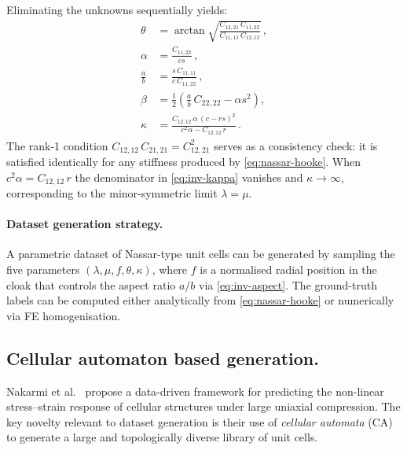 \documentclass{article}
\begin{document}
Eliminating the unknowns sequentially yields:
\begin{align}
    \theta &= \arctan\!\sqrt{\frac{C_{12,21}\,C_{11,22}}
                                   {C_{11,11}\,C_{12,12}}}\,,
    \label{eq:inv-theta}\\[4pt]
    \alpha &= \frac{C_{11,22}}{cs}\,,
    \label{eq:inv-alpha}\\[4pt]
    \frac{a}{b} &= \frac{s\,C_{11,11}}{c\,C_{11,22}}\,,
    \label{eq:inv-aspect}\\[4pt]
    \beta &= \frac{1}{2}\!\left(\frac{a}{b}\,C_{22,22}
             - \alpha s^2\right),
    \label{eq:inv-beta}\\[4pt]
    \kappa &= \frac{C_{12,12}\,\alpha\,(c-rs)^2}
                    {c^2\alpha - C_{12,12}\,r}\,.
    \label{eq:inv-kappa}
\end{align}
The rank-1 condition $C_{12,12}\,C_{21,21} = C_{12,21}^2$ serves as a
consistency check: it is satisfied identically for any stiffness produced by
\eqref{eq:nassar-hooke}.  When $c^2\alpha = C_{12,12}\,r$ the denominator
in \eqref{eq:inv-kappa} vanishes and $\kappa\to\infty$, corresponding to
the minor-symmetric limit $\lambda=\mu$.

\paragraph{Dataset generation strategy.}
A parametric dataset of Nassar-type unit cells can be generated by sampling the five parameters $(\lambda,\mu,f,\theta,\kappa)$, where $f$ is a normalised radial position in the cloak that controls the aspect ratio $a/b$ via \eqref{eq:inv-aspect}. 
The ground-truth labels can be computed either analytically from
\eqref{eq:nassar-hooke} or numerically via FE homogenisation.


\subsection{Cellular automaton based generation.}

Nakarmi et al.\ \cite{nakarmi2024} propose a data-driven framework for predicting the
non-linear stress--strain response of cellular structures under large uniaxial
compression.  The key novelty relevant to dataset generation is their use of
\emph{cellular automata} (CA) to generate a large and topologically diverse
library of unit cells.
\end{document}
